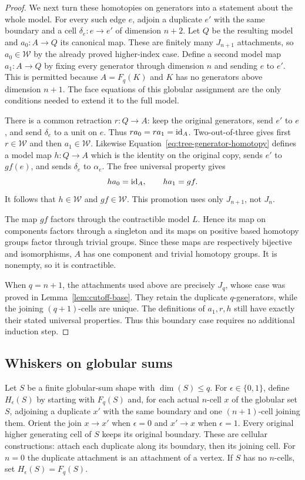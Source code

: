 \begin{proof}
We next turn these homotopies on generators into a statement
about the whole model.  For every such edge $e$, adjoin a
duplicate $e'$ with the same boundary and a cell
$\delta_e:e\to e'$ of dimension $n+2$.  Let $Q$ be the resulting
model and $a_0:A\to Q$ its canonical map.  These are finitely
many $J_{n+1}$ attachments, so $a_0\in\mathcal W$ by the already
proved higher-index case.  Define a second model map
$a_1:A\to Q$ by fixing every generator through dimension $n$
and sending $e$ to $e'$.  This is permitted because
$A=F_q(K)$ and $K$ has no generators above dimension $n+1$.
The face equations of this globular assignment are the only
conditions needed to extend it to the full model.

There is a common retraction $r:Q\to A$: keep the original
generators, send $e'$ to $e$, and send $\delta_e$ to a unit on
$e$.  Thus $ra_0=ra_1=\mathrm{id}_A$.  Two-out-of-three gives first
$r\in\mathcal W$ and then $a_1\in\mathcal W$.
Likewise Equation~\eqref{eq:tree-generator-homotopy} defines a
model map $h:Q\to A$ which is the identity on the original copy,
sends $e'$ to $gf(e)$, and sends $\delta_e$ to $\alpha_e$.
The free universal property gives
\[
 ha_0=\mathrm{id}_A,\qquad ha_1=gf.
\]
It follows that $h\in\mathcal W$ and $gf\in\mathcal W$.
This promotion uses only $J_{n+1}$, not $J_n$.

The map $gf$ factors through the contractible model $L$.  Hence
its map on components factors through a singleton and its maps
on positive based homotopy groups factor through trivial groups.
Since these maps are respectively bijective and isomorphisms,
$A$ has one component and trivial homotopy groups.  It is
nonempty, so it is contractible.

When $q=n+1$, the attachments used above are precisely $J_q$,
whose case was proved in Lemma~\ref{lem:cutoff-base}.  They retain
the duplicate $q$-generators, while the joining $(q+1)$-cells
are unique.  The definitions of $a_1,r,h$ still have exactly
their stated universal properties.  Thus this boundary case
requires no additional induction step.
\end{proof}

\subsection{Whiskers on globular sums}

Let $S$ be a finite globular-sum shape with $\dim(S)\leq q$.
For $\epsilon\in\{0,1\}$, define $H_\epsilon(S)$ by starting
with $F_q(S)$ and, for each actual $n$-cell $x$ of the globular
set $S$, adjoining a duplicate $x'$ with the same boundary and
one $(n+1)$-cell joining them.  Orient the join $x\to x'$ when
$\epsilon=0$ and $x'\to x$ when $\epsilon=1$.  Every original
higher generating cell of $S$ keeps its original boundary.
These are cellular constructions: attach each duplicate along
its boundary, then its joining cell.  For $n=0$ the duplicate
attachment is an attachment of a vertex.  If $S$ has no
$n$-cells, set $H_\epsilon(S)=F_q(S)$.

